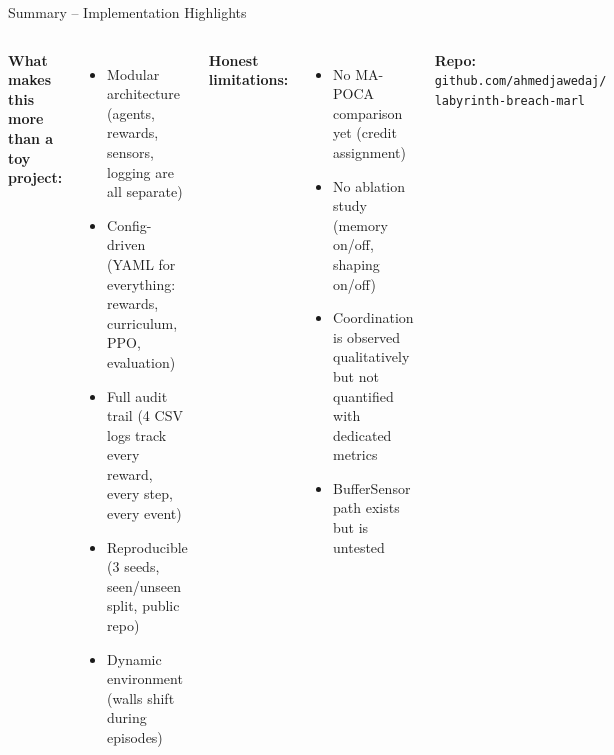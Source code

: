 \documentclass[aspectratio=169,11pt]{beamer}
\begin{document}
\begin{frame}{Summary -- Implementation Highlights}
\begin{columns}[T]
\textbf{What makes this more than a toy project:}
\begin{itemize}
\item Modular architecture (agents, rewards, sensors, logging are all separate)
\item Config-driven (YAML for everything: rewards, curriculum, PPO, evaluation)
\item Full audit trail (4 CSV logs track every reward, every step, every event)
\item Reproducible (3 seeds, seen/unseen split, public repo)
\item Dynamic environment (walls shift during episodes)
\end{itemize}

\textbf{Honest limitations:}
\begin{itemize}
\item No MA-POCA comparison yet (credit assignment)
\item No ablation study (memory on/off, shaping on/off)
\item Coordination is observed qualitatively but not quantified with dedicated metrics
\item BufferSensor path exists but is untested
\end{itemize}

\vspace{6pt}
\textbf{Repo:} \texttt{github.com/ahmedjawedaj/ labyrinth-breach-marl}
\end{columns}
\end{frame}
\end{document}
